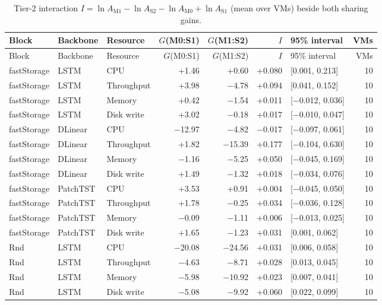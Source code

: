 \small
\setlength{\tabcolsep}{3pt}
\begin{longtable}{@{}lllrrrlr@{}}
\caption{Tier-2 interaction $I=\ln A_{\mathrm{M1}}-\ln A_{\mathrm{S2}}-\ln A_{\mathrm{M0}}+\ln A_{\mathrm{S1}}$ (mean over VMs) beside both sharing gains.}\label{tab:supp-t2-interaction}\\
\toprule
Block & Backbone & Resource & $G$(M0:S1) & $G$(M1:S2) & $I$ & 95\% interval & VMs \\
\midrule
\endfirsthead
\toprule
Block & Backbone & Resource & $G$(M0:S1) & $G$(M1:S2) & $I$ & 95\% interval & VMs \\
\midrule
\endhead
\bottomrule
\endfoot
fastStorage & LSTM & CPU & +1.46 & +0.60 & +0.080 & [0.001, 0.213] & 10 \\
fastStorage & LSTM & Throughput & +3.98 & $-$4.78 & +0.094 & [0.041, 0.152] & 10 \\
fastStorage & LSTM & Memory & +0.42 & $-$1.54 & +0.011 & [$-$0.012, 0.036] & 10 \\
fastStorage & LSTM & Disk write & +3.02 & $-$0.18 & +0.017 & [$-$0.010, 0.047] & 10 \\
fastStorage & DLinear & CPU & $-$12.97 & $-$4.82 & $-$0.017 & [$-$0.097, 0.061] & 10 \\
fastStorage & DLinear & Throughput & +1.82 & $-$15.39 & +0.177 & [$-$0.104, 0.630] & 10 \\
fastStorage & DLinear & Memory & $-$1.16 & $-$5.25 & +0.050 & [$-$0.045, 0.169] & 10 \\
fastStorage & DLinear & Disk write & +1.49 & $-$1.32 & +0.018 & [$-$0.034, 0.076] & 10 \\
fastStorage & PatchTST & CPU & +3.53 & +0.91 & +0.004 & [$-$0.045, 0.050] & 10 \\
fastStorage & PatchTST & Throughput & +1.78 & $-$0.25 & +0.034 & [$-$0.036, 0.128] & 10 \\
fastStorage & PatchTST & Memory & $-$0.09 & $-$1.11 & +0.006 & [$-$0.013, 0.025] & 10 \\
fastStorage & PatchTST & Disk write & +1.65 & $-$1.23 & +0.031 & [0.001, 0.062] & 10 \\
Rnd & LSTM & CPU & $-$20.08 & $-$24.56 & +0.031 & [0.006, 0.058] & 10 \\
Rnd & LSTM & Throughput & $-$4.63 & $-$8.71 & +0.028 & [0.013, 0.045] & 10 \\
Rnd & LSTM & Memory & $-$5.98 & $-$10.92 & +0.023 & [0.007, 0.041] & 10 \\
Rnd & LSTM & Disk write & $-$5.08 & $-$9.92 & +0.060 & [0.022, 0.099] & 10 \\

\end{longtable}
